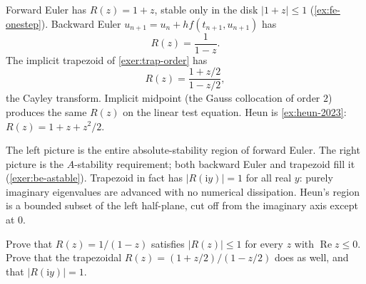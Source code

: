 \documentclass[11pt,a4paper]{article}
\begin{document}
\begin{example}
\label{ex:stab-functions}
Forward Euler has \(R(z)=1+z\), stable only in the disk \(\lvert 1+z\rvert\le 1\) (\cref{ex:fe-onestep}). Backward Euler \(u_{n+1}=u_{n}+h f(t_{n+1},u_{n+1})\) has
\[
R(z)=\frac{1}{1-z}.
\]
The implicit trapezoid of \cref{exer:trap-order} has
\[
R(z)=\frac{1+z/2}{1-z/2},
\]
the Cayley transform. Implicit midpoint (the Gauss collocation of order \(2\)) produces the same \(R(z)\) on the linear test equation. Heun is \cref{ex:heun-2023}: \(R(z)=1+z+z^{2}/2\).

\begin{center}
\end{center}

The left picture is the entire absolute-stability region of forward Euler. The right picture is the \(A\)-stability requirement; both backward Euler and trapezoid fill it (\cref{exer:be-astable}). Trapezoid in fact has \(\lvert R(\mathrm{i}y)\rvert=1\) for all real \(y\): purely imaginary eigenvalues are advanced with no numerical dissipation. Heun's region is a bounded subset of the left half-plane, cut off from the imaginary axis except at \(0\).
\end{example}

\begin{exercise}
\label{exer:be-astable}
Prove that \(R(z)=1/(1-z)\) satisfies \(\lvert R(z)\rvert\le 1\) for every \(z\) with \(\operatorname{Re}z\le 0\). Prove that the trapezoidal \(R(z)=(1+z/2)/(1-z/2)\) does as well, and that \(\lvert R(\mathrm{i}y)\rvert=1\).
\end{exercise}
\end{document}
